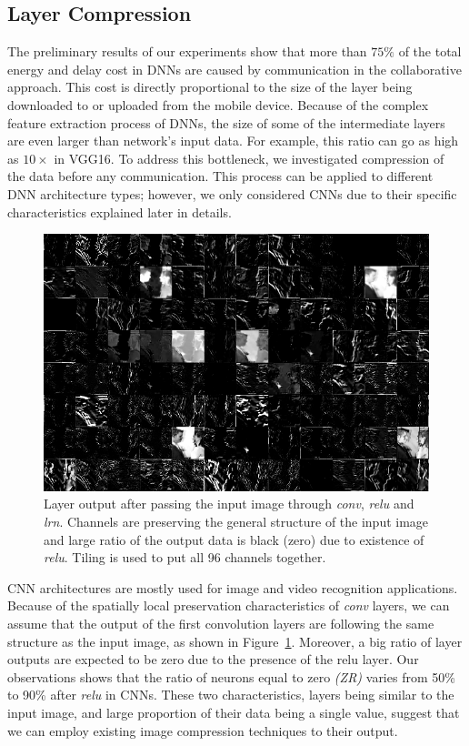 \subsection{Layer Compression}

The preliminary results of our experiments show that more than $75\%$ of the total energy and delay cost in DNNs are caused by communication in the collaborative approach. This cost is directly proportional to the size of the layer being downloaded to or uploaded from the mobile device. Because of the complex feature extraction process of DNNs, the size of some of the intermediate layers are even larger than network's input data. For example, this ratio can go as high as $10\times$ in VGG16. To address this bottleneck, we investigated compression of the data before any communication. This process can be applied to different DNN architecture types; however, we only considered CNNs due to their specific characteristics explained later in details. 

\begin{figure}[b]
\centering
\includegraphics[width=\linewidth]{picCNN}
\caption{Layer output after passing the input image through \textit{conv}, \textit{relu} and \textit{lrn}. Channels are preserving the general structure of the input image and large ratio of the output data is black (zero) due to existence of \textit{relu}. Tiling is used to put all 96 channels together.}
\label{fig:picCNN}
\end{figure}

CNN architectures are mostly used for image and video recognition applications. Because of the spatially local preservation characteristics of \textit{conv} layers, we can assume that the output of the first convolution layers are following the same structure as the input image, as shown in Figure~\ref{fig:picCNN}. Moreover, a big ratio of layer outputs are expected to be zero due to the presence of the relu layer. Our observations shows that the ratio of neurons equal to zero \textit{(ZR)} varies from 50\% to 90\% after \textit{relu} in CNNs. These two characteristics, layers being similar to the input image, and large proportion of their data being a single value, suggest that we can employ existing image compression techniques to their output. 


